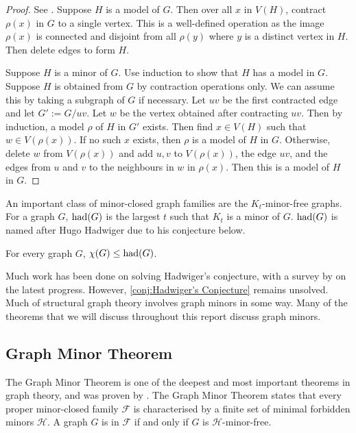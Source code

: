 \begin{proof}
	See \textcite{norinMath599GraphMinors2017}. Suppose \(H\) is a model of \(G\). Then over all \(x\) in \(V(H)\), contract \(\rho(x)\) in \(G\) to a single vertex. This is a well-defined operation as the image $\rho(x)$ is connected and disjoint from all $\rho(y)$ where $y$ is a distinct vertex in $H$. Then delete edges to form \(H\).

	Suppose $H$ is a minor of $G$. Use induction to show that \(H\) has a model in \(G\). Suppose \(H\) is obtained from \(G\) by contraction operations only. We can assume this by taking a subgraph of \(G\) if necessary. Let \(uv\) be the first contracted edge and let \(G' := G / uv\). Let \(w\) be the vertex obtained after contracting \(uv\). Then by induction, a model \(\rho\) of \(H\) in \(G'\) exists. Then find $x \in V(H)$ such that $w \in V(\rho(x))$. If no such $x$ exists, then $\rho$ is a model of $H$ in $G$. Otherwise, delete \(w\) from \(V(\rho(x)) \) and add $u, v$ to $V(\rho(x))$, the edge $uv$, and the edges from $u$ and $v$ to the neighbours in $w$ in $\rho(x)$. Then this is a model of \(H\) in \(G\). 
\end{proof}

An important class of minor-closed graph families are the \(K_t\)-minor-free graphs. For a graph \(G\), \(\operatorname{had}(G)\) is the largest \(t\) such that \(K_t\) is a minor of \(G\). $\operatorname{had}(G)$ is named after Hugo Hadwiger due to his conjecture below.
\begin{conjecture}\label{conj:Hadwiger's Conjecture}
	For every graph \(G\), \(\chi(G) \leq \operatorname{had}(G)\).
\end{conjecture}
Much work has been done on solving Hadwiger's conjecture, with a survey by \textcite{seymourHadwigersConjecture2016} on the latest progress. However, \cref{conj:Hadwiger's Conjecture} remains unsolved. Much of structural graph theory involves graph minors in some way. Many of the theorems that we will discuss throughout this report discuss graph minors. 

 \subsection{Graph Minor Theorem}
The Graph Minor Theorem is one of the deepest and most important theorems in graph theory, and was proven by \textcite{robertsonGraphMinorsXX2004}. The Graph Minor Theorem states that every proper minor-closed family $\mathcal{F}$ is characterised by a finite set of minimal forbidden minors $\mathcal{H}$. A graph $G$ is in $\mathcal{F}$ if and only if $G$ is $\mathcal{H}$-minor-free.

